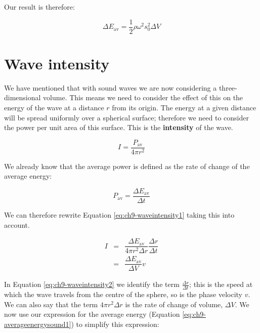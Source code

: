 \documentclass[
]{book}
\begin{document}
Our result is therefore:

\begin{equation}
\Delta E_{\mathrm{av}} = \frac{1}{2}\rho \omega^2 s_0^2 \Delta V
\label{eq:ch9-averageenergysound1}
\end{equation}

\hypertarget{sec:ch9-waveintensity}{%
\section{Wave intensity}\label{sec:ch9-waveintensity}}

We have mentioned that with sound waves we are now considering a three-dimensional volume. This means we need to consider the effect of this on the energy of the wave at a distance \(r\) from its origin. The energy at a given distance will be spread uniformly over a spherical surface; therefore we need to consider the power per unit area of this surface. This is the \textbf{intensity} of the wave.

\begin{equation}
I = \frac{P_\text{av}}{4\pi r^2}
\label{eq:ch9-waveintensity1}
\end{equation}

We already know that the average power is defined as the rate of change of the average energy:

\begin{equation}
P_\text{av} = \frac{\Delta E_\text{av}}{\Delta t}
\end{equation}

We can therefore rewrite Equation \eqref{eq:ch9-waveintensity1} taking this into account.

\begin{equation}
\begin{array}{rcl}
I & = &  \dfrac{\Delta E_\text{av}}{4\pi r^2 \Delta r} \dfrac{\Delta r}{\Delta t} \\
 &=& \dfrac{\Delta E_\text{av}}{\Delta V} v
\end{array}
\label{eq:ch9-waveintensity2}
\end{equation}

In Equation \eqref{eq:ch9-waveintensity2} we identify the term \(\frac{\Delta r}{\Delta t}\); this is the speed at which the wave travels from the centre of the sphere, so is the phase velocity \(v\). We can also say that the term \(4 \pi r^2 \Delta r\) is the rate of change of volume, \(\Delta V\). We now use our expression for the average energy (Equation \eqref{eq:ch9-averageenergysound1}) to simplify this expression:
\end{document}

